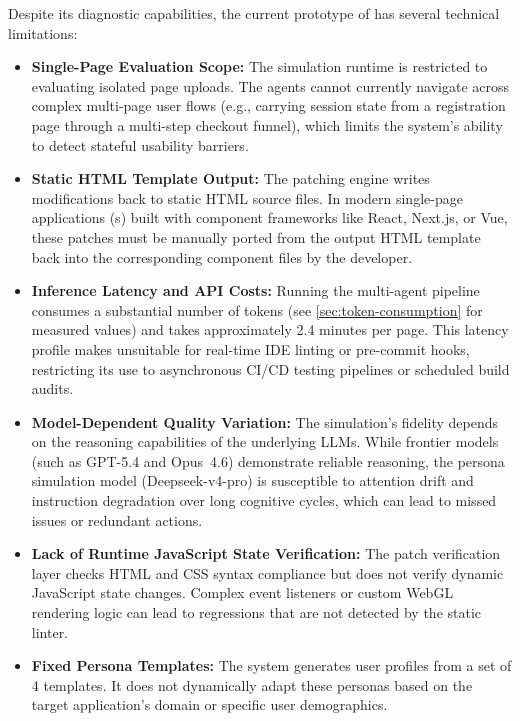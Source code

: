 Despite its diagnostic capabilities, the current prototype of \versimux{} has several technical limitations:

\begin{itemize}
  \item \textbf{Single-Page Evaluation Scope:} The simulation runtime is restricted to evaluating isolated page uploads. The agents cannot currently navigate across complex multi-page user flows (e.g., carrying session state from a registration page through a multi-step checkout funnel), which limits the system's ability to detect stateful usability barriers.
  \item \textbf{Static HTML Template Output:} The patching engine writes modifications back to static HTML source files. In modern single-page applications (s) built with component frameworks like React, Next.js, or Vue, these patches must be manually ported from the output HTML template back into the corresponding component files by the developer.
  \item \textbf{Inference Latency and API Costs:} Running the multi-agent pipeline consumes a substantial number of tokens (see \cref{sec:token-consumption} for measured values) and takes approximately 2.4 minutes per page. This latency profile makes \versimux{} unsuitable for real-time IDE linting or pre-commit hooks, restricting its use to asynchronous CI/CD testing pipelines or scheduled build audits.
  \item \textbf{Model-Dependent Quality Variation:} The simulation's fidelity depends on the reasoning capabilities of the underlying LLMs. While frontier models (such as GPT-5.4 and Opus~4.6) demonstrate reliable reasoning, the persona simulation model (Deepseek-v4-pro) is susceptible to attention drift and instruction degradation over long cognitive cycles, which can lead to missed issues or redundant actions.
  \item \textbf{Lack of Runtime JavaScript State Verification:} The patch verification layer checks HTML and CSS syntax compliance but does not verify dynamic JavaScript state changes. Complex event listeners or custom WebGL rendering logic can lead to regressions that are not detected by the static linter.
  \item \textbf{Fixed Persona Templates:} The system generates user profiles from a set of 4 templates. It does not dynamically adapt these personas based on the target application's domain or specific user demographics.
\end{itemize}



